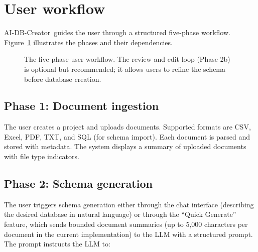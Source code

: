 \documentclass[11pt,a4paper]{article}
\newcommand{\aidb}{AI-DB-Creator}
\begin{document}
\section{User workflow}
\label{sec:workflow}
\aidb\ guides the user through a structured five-phase workflow. Figure~\ref{fig:workflow} illustrates the phases and their dependencies.

\begin{figure}[htbp]
\centering
{}
\caption{The five-phase user workflow. The review-and-edit loop (Phase 2b) is optional but recommended; it allows users to refine the schema before database creation.}
\label{fig:workflow}
\end{figure}

\subsection{Phase 1: Document ingestion}
The user creates a project and uploads documents. Supported formats are CSV, Excel, PDF, TXT, and SQL (for schema import). Each document is parsed and stored with metadata. The system displays a summary of uploaded documents with file type indicators.

\subsection{Phase 2: Schema generation}
The user triggers schema generation either through the chat interface (describing the desired database in natural language) or through the ``Quick Generate'' feature, which sends bounded document summaries (up to 5,000 characters per document in the current implementation) to the LLM with a structured prompt. The prompt instructs the LLM to:
\end{document}
